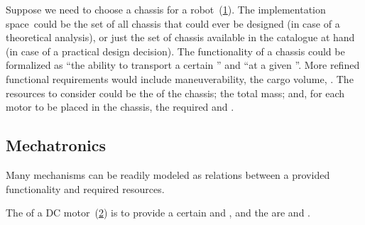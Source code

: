 \begin{example}
  \label{exa:chassis}
  Suppose we need to choose a chassis for a robot~(\cref{fig:gmcdp_chassis_eval}).
  The implementation space~\impsp could be the set of all chassis that could ever be designed (in case of a theoretical analysis),
or just the set of chassis available in the catalogue at hand (in case of a practical design decision).
  The functionality of a chassis could be formalized as ``the ability to transport a certain '' and ``at a given ''.
  More refined functional requirements would include maneuverability, the cargo volume, \etc.
  The resources to consider could be the  of the chassis; the total mass;
and, for each motor to be placed in the chassis, the required  and .
\end{example}

\begin{figure}[h]
  \centering
  \caption{}
  \label{fig:gmcdp_chassis_eval}
\end{figure}




\subsection{Mechatronics}
Many mechanisms can be readily modeled as relations between a provided  functionality and required resources.

\begin{example}
  The  of a DC motor~(\cref{fig:dc_motor}) is to provide a certain  and , and the  are  and .
\end{example}

\begin{figure}[h]
  \begin{center}
  \end{center}
  \caption{\label{fig:dc_motor}}
\end{figure}


